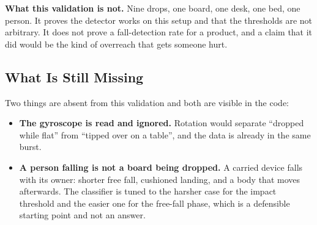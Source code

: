 \begin{warningbox}
    \textbf{What this validation is not.} Nine drops, one board, one desk, one bed, one
    person. It proves the detector works on this setup and that the thresholds are not
    arbitrary. It does not prove a fall-detection rate for a product, and a claim that it did
    would be the kind of overreach that gets someone hurt.
\end{warningbox}

\subsection{What Is Still Missing}

Two things are absent from this validation and both are visible in the code:

\begin{itemize}
    \item \textbf{The gyroscope is read and ignored.} Rotation would separate ``dropped while
          flat'' from ``tipped over on a table'', and the data is already in the same burst.
    \item \textbf{A person falling is not a board being dropped.} A carried device falls with
          its owner: shorter free fall, cushioned landing, and a body that moves afterwards.
          The classifier is tuned to the harsher case for the impact threshold and the easier
          one for the free-fall phase, which is a defensible starting point and not an answer.
\end{itemize}
